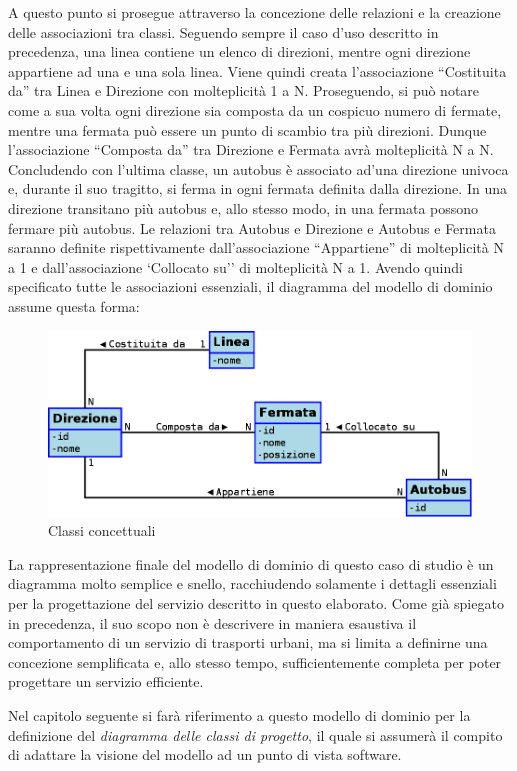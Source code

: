 A questo punto si prosegue attraverso la concezione delle relazioni e la creazione delle associazioni tra classi.
Seguendo sempre il caso d'uso descritto in precedenza, una linea contiene un elenco di direzioni, mentre ogni direzione appartiene ad una e una sola linea. Viene quindi creata l'associazione ``Costituita da'' tra Linea e Direzione con molteplicità 1 a N.
Proseguendo, si può notare come a sua volta ogni direzione sia composta da un cospicuo numero di fermate, mentre una fermata può essere un punto di scambio tra più direzioni. Dunque l'associazione ``Composta da'' tra Direzione e Fermata avrà molteplicità N a N.
Concludendo con l'ultima classe, un autobus è associato ad'una direzione univoca e, durante il suo tragitto, si ferma in ogni fermata definita dalla direzione. In una direzione transitano più autobus e, allo stesso modo, in una fermata possono fermare più autobus. Le relazioni tra Autobus e Direzione e Autobus e Fermata saranno definite rispettivamente dall'associazione ``Appartiene'' di molteplicità N a 1 e dall'associazione `Collocato su'' di molteplicità N a 1.
\newpage
Avendo quindi specificato tutte le associazioni essenziali, il diagramma del modello di dominio assume questa forma:
\vspace{1cm}
\begin{figure}[htbp]
\begin{center}
\includegraphics[width=12cm]{contents/images/modelloDominio}
\end{center}
\caption{Classi concettuali}
\label{fig:domain_model}
\end{figure}
\vspace{1cm}
La rappresentazione finale del modello di dominio di questo caso di studio è un diagramma molto semplice e snello, racchiudendo solamente i dettagli essenziali per la progettazione del servizio descritto in questo elaborato.
Come già spiegato in precedenza, il suo scopo non è descrivere in maniera esaustiva il comportamento di un servizio di trasporti urbani, ma si limita a definirne una concezione semplificata e, allo stesso tempo, sufficientemente completa per poter progettare un servizio efficiente.

Nel capitolo seguente si farà riferimento a questo modello di dominio per la definizione del {\itshape diagramma delle classi di progetto}, il quale si assumerà il compito di adattare la visione del modello ad un punto di vista software.

\newpage